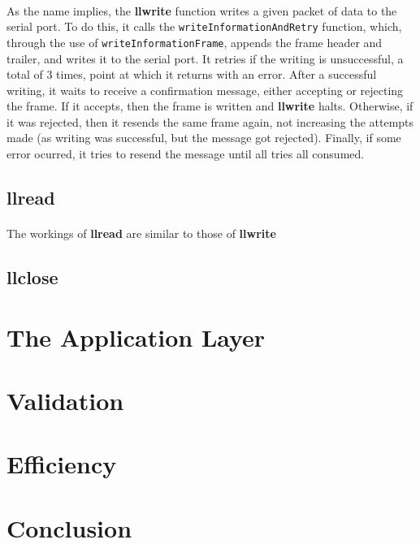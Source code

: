 \documentclass[11pt]{article}
\begin{document}
\paragraph{}As the name implies, the \textbf{llwrite} function writes a given packet of data to the serial
port. To do this, it calls the \verb|writeInformationAndRetry| function, which, through the use of
\verb|writeInformationFrame|, appends the frame header and trailer, and writes it to the serial port. It
retries if the writing is unsuccessful, a total of 3 times, point at which it returns with an error.
After a successful writing, it waits to receive a confirmation message, either accepting or rejecting the
frame. If it accepts, then the frame is written and \textbf{llwrite} halts. Otherwise, if it was rejected, then it
resends the same frame again, not increasing the attempts made (as writing was successful, but the message
got rejected). Finally, if some error ocurred, it tries to resend the message until all tries all consumed.

\subsection*{llread}

\paragraph{}The workings of \textbf{llread} are similar to those of \textbf{llwrite}

\subsection*{llclose}

\section{The Application Layer}

\section{Validation}

\section{Efficiency}

\section{Conclusion}
\end{document}

